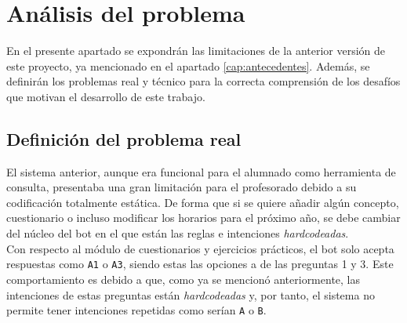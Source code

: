 \documentclass[a4paper,12pt,twoside,final]{book}
\begin{document}
\chapter{Análisis del problema}
\label{cap:analisis_problema}
En el presente apartado se expondrán las limitaciones de la anterior versión de este proyecto, ya mencionado en el apartado \ref{cap:antecedentes}. Además, se definirán los problemas real y técnico para la correcta comprensión de los desafíos que motivan el desarrollo de este trabajo.

\section{Definición del problema real}
\label{sec:def_problema}
El sistema anterior, aunque era funcional para el alumnado como herramienta de consulta, presentaba una gran limitación para el profesorado debido a su codificación totalmente estática. De forma que si se quiere añadir algún concepto, cuestionario o incluso modificar los horarios para el próximo año, se debe cambiar del núcleo del bot en el que están las reglas e intenciones \textit{hardcodeadas}.\\

Con respecto al módulo de cuestionarios y ejercicios prácticos, el bot solo acepta respuestas como \texttt{A1} o \texttt{A3}, siendo estas las opciones a de las preguntas 1 y 3. Este comportamiento es debido a que, como ya se mencionó anteriormente, las intenciones de estas preguntas están \textit{hardcodeadas} y, por tanto, el sistema no permite tener intenciones repetidas como serían \texttt{A} o \texttt{B}.\\
\end{document}
